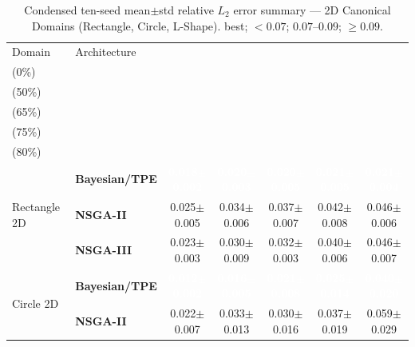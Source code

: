 \begin{table}[H]
\centering\small\setlength{\tabcolsep}{4pt}
\caption{Condensed ten-seed mean$\pm$std relative $L_2$ error summary --- 2D Canonical Domains (Rectangle, Circle, L-Shape).
\phantom{x} best; \phantom{x} ${<}0.07$;
\phantom{x} $0.07$--$0.09$; \phantom{x} ${\geq}0.09$.}
\label{tab:l2_summary_2d_canonical}
\begin{tabular}{@{}llccccc@{}}
\toprule
Domain & Architecture & \makecell{$k{=}1$\\(0\%)} & \makecell{$k{=}2$\\(50\%)} & \makecell{$k{=}3$\\(65\%)} & \makecell{$k{=}4$\\(75\%)} & \makecell{$k{=}5$\\(80\%)} \\
\midrule
\multirow{3}{*}{Rectangle 2D}
  & \textbf{Bayesian/TPE} & \cellcolor{ForestGreen!55}\textcolor{white}{\textbf{0.018$\pm$0.002}} & \cellcolor{ForestGreen!55}\textcolor{white}{\textbf{0.020$\pm$0.003}} & \cellcolor{ForestGreen!55}\textcolor{white}{\textbf{0.020$\pm$0.005}} & \cellcolor{ForestGreen!55}\textcolor{white}{\textbf{0.021$\pm$0.005}} & \cellcolor{ForestGreen!55}\textcolor{white}{\textbf{0.021$\pm$0.004}} \\
  & \textbf{NSGA-II} & \cellcolor{ForestGreen!25}0.025$\pm$0.005 & \cellcolor{ForestGreen!25}0.034$\pm$0.006 & \cellcolor{ForestGreen!25}0.037$\pm$0.007 & \cellcolor{ForestGreen!25}0.042$\pm$0.008 & \cellcolor{ForestGreen!25}0.046$\pm$0.006 \\
  & \textbf{NSGA-III} & \cellcolor{ForestGreen!25}0.023$\pm$0.003 & \cellcolor{ForestGreen!25}0.030$\pm$0.009 & \cellcolor{ForestGreen!25}0.032$\pm$0.003 & \cellcolor{ForestGreen!25}0.040$\pm$0.006 & \cellcolor{ForestGreen!25}0.046$\pm$0.007 \\
\midrule
\multirow{3}{*}{Circle 2D}
  & \textbf{Bayesian/TPE} & \cellcolor{ForestGreen!55}\textcolor{white}{\textbf{0.012$\pm$0.002}} & \cellcolor{ForestGreen!55}\textcolor{white}{\textbf{0.016$\pm$0.005}} & \cellcolor{ForestGreen!55}\textcolor{white}{\textbf{0.021$\pm$0.008}} & \cellcolor{ForestGreen!55}\textcolor{white}{\textbf{0.025$\pm$0.014}} & \cellcolor{ForestGreen!55}\textcolor{white}{\textbf{0.040$\pm$0.020}} \\
  & \textbf{NSGA-II} & \cellcolor{ForestGreen!25}0.022$\pm$0.007 & \cellcolor{ForestGreen!25}0.033$\pm$0.013 & \cellcolor{ForestGreen!25}0.030$\pm$0.016 & \cellcolor{ForestGreen!25}0.037$\pm$0.019 & \cellcolor{ForestGreen!25}0.059$\pm$0.029 \\

\end{tabular}
\end{table}
